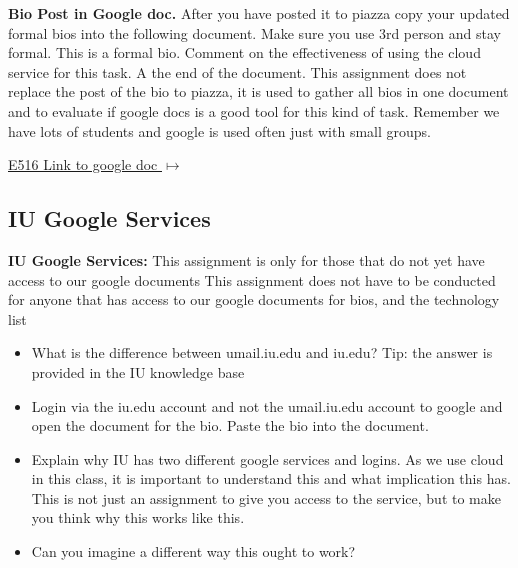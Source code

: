 \begin{exercise} \label{E:616-bio-googledocs}

  {\bf Bio Post in Google doc.} After you have posted it to piazza
  copy your updated formal bios into the following document.  Make
  sure you use 3rd person and stay formal. This is a formal
  bio. Comment on the effectiveness of using the cloud service for
  this task. A the end of the document. This assignment does not
  replace the post of the bio to piazza, it is used to gather all bios
  in one document and to evaluate if google docs is a good tool for
  this kind of task. Remember we have lots of students and google is
  used often just with small groups.
 
 \smallskip

 {\hfill \href{https://docs.google.com/document/d/1ejzlKYqC3dLac8WXVpcPQsJh1j4BDqRxxgGg1cFQbeQ/edit?usp=sharing}{E516 Link to google doc $\mapsto$}}

 \end{exercise}

\subsection{IU Google Services}
\label{E:e616-iu-google-services}

\begin{exercise}\label{E:616-iu-google}

  {\bf IU Google Services:} This assignment is only for those that do
  not yet have access to our google documents This assignment does not
  have to be conducted for anyone that has access to our google
  documents for bios, and the technology list

  \begin{itemize}
 
  \item What is the difference between umail.iu.edu and iu.edu? Tip:
    the answer is provided in the IU knowledge base

  \item Login via the iu.edu account and not the umail.iu.edu account
    to google and open the document for the bio. Paste the bio into
    the document.

  \item Explain why IU has two different google services and
    logins. As we use cloud in this class, it is important to
    understand this and what implication this has. This is not just an
    assignment to give you access to the service, but to make you
    think why this works like this.

  \item Can you imagine a different way this ought to work?

  \end{itemize}

\end{exercise}


